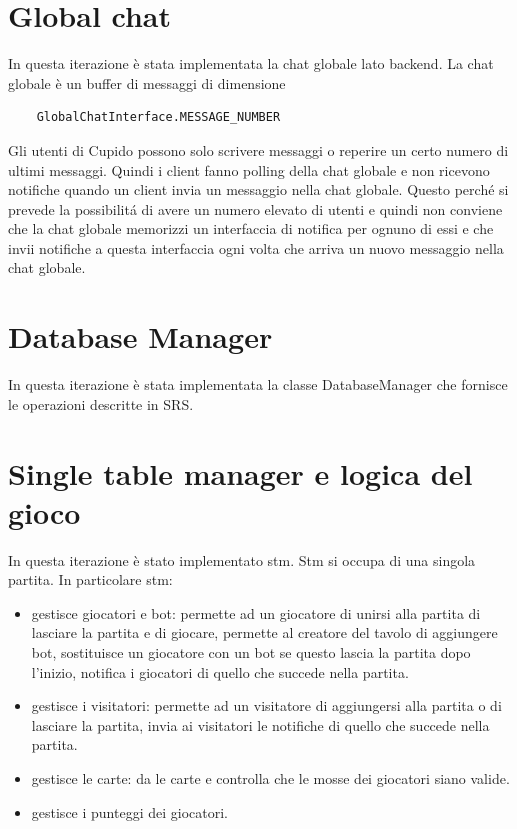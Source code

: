 \section{Global chat}
  In questa iterazione \`e stata implementata la chat globale lato backend. La chat globale \`e un buffer di messaggi di dimensione 
  \begin{verbatim}
    GlobalChatInterface.MESSAGE_NUMBER
  \end{verbatim}
  Gli utenti di Cupido possono solo scrivere messaggi o reperire un certo numero di ultimi messaggi. Quindi i client fanno polling della chat globale e non ricevono notifiche quando un client invia un messaggio nella chat globale. Questo perch\'e si prevede la possibilit\'a di avere un numero elevato di utenti e quindi non conviene che la chat globale memorizzi un interfaccia di notifica per ognuno di essi e che invii notifiche a questa interfaccia ogni volta che arriva un nuovo messaggio nella chat globale.

\section{Database Manager}
  In questa iterazione \`e stata implementata la classe DatabaseManager che fornisce le operazioni descritte in SRS.


\section{Single table manager e logica del gioco}
  In questa iterazione \`e stato implementato stm. Stm si occupa di una singola partita. In particolare stm:
  \begin{itemize}
    \item 
      gestisce giocatori e bot: permette ad un giocatore di unirsi alla partita  di lasciare la partita e di giocare, permette al creatore del tavolo di aggiungere bot, sostituisce un giocatore con un bot se questo lascia la partita dopo l'inizio, notifica i giocatori di quello che succede nella partita.
    \item
      gestisce i visitatori: permette ad un visitatore di aggiungersi alla partita o di lasciare la partita, invia ai visitatori le notifiche di quello che succede nella partita.
    \item
      gestisce le carte: da le carte e controlla che le mosse dei giocatori siano valide.
    \item
      gestisce i punteggi dei giocatori.
  \end{itemize}
  

